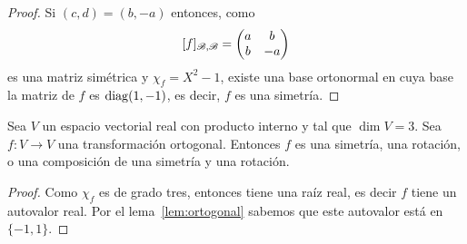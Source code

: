 \begin{prop}
\begin{proof}
        Si $(c,d)=(b,-a)$ entonces, como 
        \[
        [f]_{\mathscr{B},\mathscr{B}}=\begin{pmatrix}
            a & b\\
            b & -a
        \end{pmatrix}
		\]
		es una matriz simétrica y $\chi_f=X^2-1$, existe una base ortonormal en
		cuya base la matriz de $f$ es $\operatorname{diag}(1,-1)$, es decir, $f$ es una
		simetría.  
   \end{proof}
\end{prop}

\begin{prop}
    \label{pro:ortogonales:dim=3}
    Sea $V$ un espacio vectorial real con producto interno y tal que $\dim
    V=3$. Sea $f\colon V\to V$ una transformación ortogonal. Entonces $f$ es
    una simetría, una rotación, o una composición de una simetría y una
    rotación. 

    \begin{proof}
        Como $\chi_f$ es de grado tres, entonces tiene una raíz real, es decir
        $f$ tiene un autovalor real. Por el lema~\ref{lem:ortogonal}
        sabemos que este autovalor está en $\{-1,1\}$. 


\end{proof}
\end{prop}
